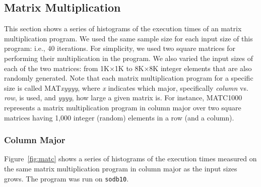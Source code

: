 \documentclass[10pt]{article}
\begin{document}

%

\clearpage
\pagebreak

\subsection{Matrix Multiplication~\label{sec:mm}} 

This section shows a series of histograms of 
the execution times of an matrix multiplication program. 
We used the same sample size for each input size of this program: i.e., 40 iterations. 
For simplicity, we used two square matrices for performing their multiplication in the program.  
We also varied the input sizes of each of the two matrices: 
from 1K$\times$1K to 8K$\times$8K integer elements that are also randomly generated. 
Note that each matrix multiplication program for a specific size is called MAT{\it xyyyy}, 
where {\it x} indicates which major, specifically {\em column} vs. {\em row}, is used, and {\it yyyy}, how large a given matrix is. 
For instance, MATC1000 represents a matrix multiplication program 
in column major over two square matrices having 1,000 integer (random) 
elements in a row (and a column). 

\pagebreak

\subsubsection{Column Major}

Figure~\ref{fig:matc} shows a series of 
histograms of the execution times measured on 
the same matrix multiplication program in column major 
as the input sizes grows. The program was run on {\tt sodb10}.
\end{document}
